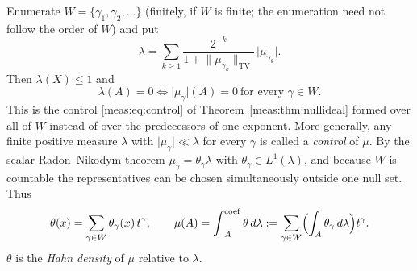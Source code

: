 \documentclass[11pt]{article}
\numberwithin{equation}{section}
\theoremstyle{definition}
\theoremstyle{remark}
\newcommand{\TV}{\mathrm{TV}}
\newcommand{\norm}[1]{\lVert#1\rVert}
\newcommand{\abs}[1]{\lvert#1\rvert}
\newcommand{\intc}{\mathop{\int}\nolimits^{\mathrm{coef}}}
\begin{document}
Enumerate $W=\{\gamma_1,\gamma_2,\ldots\}$ (finitely, if $W$ is finite; the
enumeration need not follow the order of $W$) and put
\begin{equation}\label{meas:cw:eq:control}
 \lambda=\sum_{k\ge1}\frac{2^{-k}}{1+\norm{\mu_{\gamma_k}}_\TV}\,\abs{\mu_{\gamma_k}} .
\end{equation}
Then $\lambda(X)\le1$ and
\begin{equation}\label{meas:cw:eq:control-null}
 \lambda(A)=0\iff\abs{\mu_\gamma}(A)=0\ \text{for every }\gamma\in W .
\end{equation}
This is the control \eqref{meas:eq:control} of Theorem~\ref{meas:thm:nullideal}
formed over all of $W$ instead of over the predecessors of one exponent. More
generally, any finite positive measure $\lambda$ with $\abs{\mu_\gamma}\ll\lambda$
for every $\gamma$ is called a \emph{control} of $\mu$. By the scalar
Radon--Nikodym theorem $\mu_\gamma=\theta_\gamma\lambda$ with
$\theta_\gamma\in L^1(\lambda)$, and because $W$ is countable the representatives
can be chosen simultaneously outside one null set. Thus
\begin{equation}\label{meas:cw:eq:density}
 \theta(x)=\sum_{\gamma\in W}\theta_\gamma(x)\,t^\gamma,\qquad
 \mu(A)=\intc_A\theta\,d\lambda
 :=\sum_{\gamma\in W}\Bigl(\int_A\theta_\gamma\,d\lambda\Bigr)t^\gamma .
\end{equation}
$\theta$ is the \emph{Hahn density} of $\mu$ relative to $\lambda$.
\end{document}
